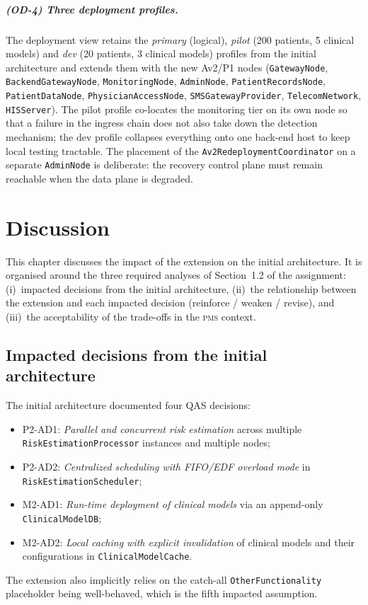 \paragraph{(OD-4) Three deployment profiles.}
The deployment view retains the \emph{primary} (logical), \emph{pilot}
(200 patients, 5 clinical models) and \emph{dev} (20 patients,
3 clinical models) profiles from the initial architecture and extends
them with the new Av2/P1 nodes (\texttt{GatewayNode},
\texttt{BackendGatewayNode}, \texttt{MonitoringNode}, \texttt{AdminNode},
\texttt{PatientRecordsNode}, \texttt{PatientDataNode},
\texttt{PhysicianAccessNode}, \texttt{SMSGatewayProvider},
\texttt{TelecomNetwork}, \texttt{HISServer}). The pilot profile
co-locates the monitoring tier on its own node so that a failure in the
ingress chain does not also take down the detection mechanism; the dev
profile collapses everything onto one back-end host to keep local
testing tractable. The placement of the
\texttt{Av2RedeploymentCoordinator} on a separate \texttt{AdminNode} is
deliberate: the recovery control plane must remain reachable when the
data plane is degraded.


\chapter{Discussion}
\label{ch:discussion}

This chapter discusses the impact of the extension on the initial
architecture. It is organised around the three required analyses of
Section~1.2 of the assignment: (i)~impacted decisions from the initial
architecture, (ii)~the relationship between the extension and each
impacted decision (reinforce / weaken / revise), and (iii)~the
acceptability of the trade-offs in the \textsc{pms} context.

\section{Impacted decisions from the initial architecture}

The initial architecture documented four QAS decisions:
\begin{itemize}
  \item P2-AD1: \emph{Parallel and concurrent risk estimation} across
        multiple \texttt{RiskEstimationProcessor} instances and multiple
        nodes;
  \item P2-AD2: \emph{Centralized scheduling with FIFO/EDF overload mode}
        in \texttt{RiskEstimationScheduler};
  \item M2-AD1: \emph{Run-time deployment of clinical models} via an
        append-only \texttt{ClinicalModelDB};
  \item M2-AD2: \emph{Local caching with explicit invalidation} of
        clinical models and their configurations in
        \texttt{ClinicalModelCache}.
\end{itemize}
The extension also implicitly relies on the catch-all
\texttt{OtherFunctionality} placeholder being well-behaved, which is the
fifth impacted assumption.

